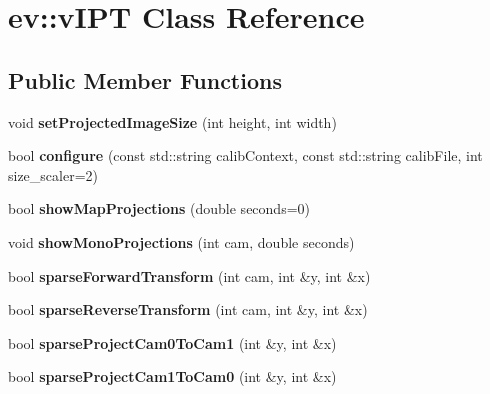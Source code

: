 \hypertarget{classev_1_1vIPT}{}\section{ev\+:\+:v\+I\+PT Class Reference}
\label{classev_1_1vIPT}
\subsection*{Public Member Functions}
\begin{DoxyCompactItemize}
\item 
\mbox{\label{classev_1_1vIPT_a3ba2129509fc6405990cd138ebabde0d}} 
void {\bfseries set\+Projected\+Image\+Size} (int height, int width)
\item 
\mbox{\label{classev_1_1vIPT_a0e2d87532a04fd0ba19464133d7df292}} 
bool {\bfseries configure} (const std\+::string calib\+Context, const std\+::string calib\+File, int size\+\_\+scaler=2)
\item 
\mbox{\label{classev_1_1vIPT_ab946ef3a96b37185ce14b578641673ad}} 
bool {\bfseries show\+Map\+Projections} (double seconds=0)
\item 
\mbox{\label{classev_1_1vIPT_a15a9b59129f7dc5d56f2164a33853bb4}} 
void {\bfseries show\+Mono\+Projections} (int cam, double seconds)
\item 
\mbox{\label{classev_1_1vIPT_ab607f86eec5f5147d5940293c298ac87}} 
bool {\bfseries sparse\+Forward\+Transform} (int cam, int \&y, int \&x)
\item 
\mbox{\label{classev_1_1vIPT_af75a5bb46e8a8c17146a00cd38530c83}} 
bool {\bfseries sparse\+Reverse\+Transform} (int cam, int \&y, int \&x)
\item 
\mbox{\label{classev_1_1vIPT_a70d19f6494aba2f6a16f057cd53ca659}} 
bool {\bfseries sparse\+Project\+Cam0\+To\+Cam1} (int \&y, int \&x)
\item 
\mbox{\label{classev_1_1vIPT_a8d87fce16f963ac875c65cc21643ada5}} 
bool {\bfseries sparse\+Project\+Cam1\+To\+Cam0} (int \&y, int \&x)
\item 

\end{DoxyCompactItemize}
